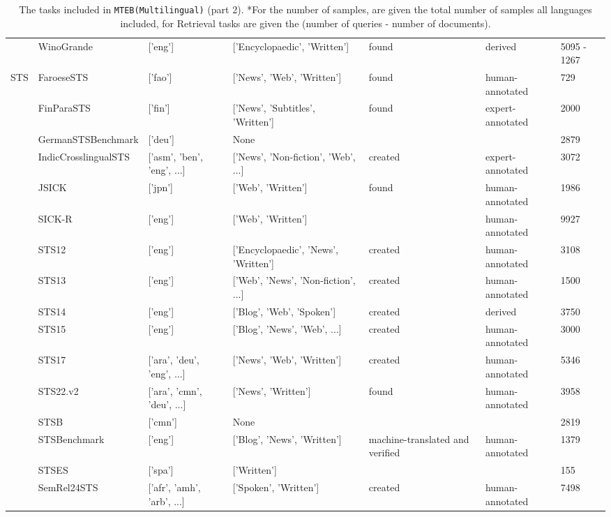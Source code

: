 \begin{table*}[!htb]
{\begin{tabular}{lllllll}
     & WinoGrande \cite{xiao2024rar} & ['eng'] & ['Encyclopaedic', 'Written'] & found & derived & 5095 - 1267 \\
    \cline{1-7}
    \multirow[t]{16}{*}{STS} & FaroeseSTS \cite{snaebjarnarson-etal-2023-transfer} & ['fao'] & ['News', 'Web', 'Written'] & found & human-annotated & 729 \\
     & FinParaSTS \cite{kanerva-etal-2021-finnish} & ['fin'] & ['News', 'Subtitles', 'Written'] & found & expert-annotated & 2000 \\
     & GermanSTSBenchmark \cite{huggingface:dataset:stsb_multi_mt} & ['deu'] & None & & & 2879 \\
     & IndicCrosslingualSTS \cite{10.1162/tacl_a_00452} & ['asm', 'ben', 'eng', ...] & ['News', 'Non-fiction', 'Web', ...] & created & expert-annotated & 3072 \\
     & JSICK \cite{yanaka2022compositional} & ['jpn'] & ['Web', 'Written'] & found & human-annotated & 1986 \\
     & SICK-R \cite{marelli-etal-2014-sick} & ['eng'] & ['Web', 'Written'] & & human-annotated & 9927 \\
     & STS12 \cite{10.5555/2387636.2387697} & ['eng'] & ['Encyclopaedic', 'News', 'Written'] & created & human-annotated & 3108 \\
     & STS13 \cite{Agirre2013SEM2S} & ['eng'] & ['Web', 'News', 'Non-fiction', ...] & created & human-annotated & 1500 \\
     & STS14 \cite{bandhakavi-etal-2014-generating} & ['eng'] & ['Blog', 'Web', 'Spoken'] & created & derived & 3750 \\
     & STS15 \cite{bicici-2015-rtm} & ['eng'] & ['Blog', 'News', 'Web', ...] & created & human-annotated & 3000 \\
     & STS17 \cite{cer-etal-2017-semeval} & ['ara', 'deu', 'eng', ...] & ['News', 'Web', 'Written'] & created & human-annotated & 5346 \\
     & STS22.v2 \cite{chen-etal-2022-semeval} & ['ara', 'cmn', 'deu', ...] & ['News', 'Written'] & found & human-annotated & 3958 \\
     & STSB \cite{xiao2024cpack} & ['cmn'] & None & & & 2819 \\
     & STSBenchmark \cite{huggingface:dataset:stsb_multi_mt} & ['eng'] & ['Blog', 'News', 'Written'] & machine-translated and verified & human-annotated & 1379 \\
     & STSES \cite{agirre2015semeval} & ['spa'] & ['Written'] & & & 155 \\
     & SemRel24STS \cite{ousidhoum2024semrel2024} & ['afr', 'amh', 'arb', ...] & ['Spoken', 'Written'] & created & human-annotated & 7498 \\
\bottomrule
\end{tabular}
}
\caption{The tasks included in \texttt{MTEB(Multilingual)} (part 2). *For the number of samples, are given the total number of samples all languages included, for Retrieval tasks are given the (number of queries - number of documents).}
\label{tab:mteb_multilingual_task_overview2}
\end{table*}